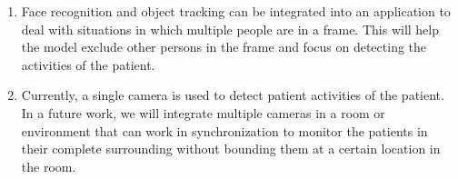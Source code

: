\begin{enumerate}
    \item Face recognition and object tracking can be integrated into an application to deal with situations in which multiple people are in a frame. This will help the model  exclude other persons in the frame and focus on detecting the activities of the patient.
    \item Currently, a single camera is used to detect patient activities of the patient. In a future work, we will integrate multiple cameras in a room or environment that can work in synchronization to monitor the patients in their complete surrounding without bounding them at a certain location in the room.
    
    

\end{enumerate}

